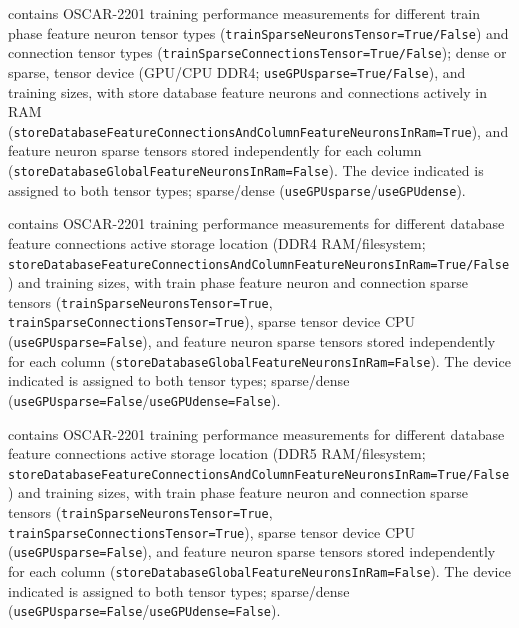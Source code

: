  contains OSCAR-2201 training performance measurements for different train phase feature neuron tensor types (\texttt{trainSparseNeuronsTensor=True/False}) and connection tensor types (\texttt{trainSparseConnectionsTensor=True/False}); dense or sparse, tensor device (GPU/CPU DDR4; \texttt{useGPUsparse=True/False}), and training sizes, with store database feature neurons and connections actively in RAM (\texttt{storeDatabaseFeatureConnectionsAndColumnFeatureNeuronsInRam=True}), and feature neuron sparse tensors stored independently for each column (\texttt{storeDatabaseGlobalFeatureNeuronsInRam=False}). The device indicated is assigned to both tensor types; sparse/dense (\texttt{useGPUsparse}/\texttt{useGPUdense}).

 contains OSCAR-2201 training performance measurements for different database feature connections active storage location (DDR4 RAM/filesystem; \texttt{storeDatabaseFeatureConnectionsAndColumnFeatureNeuronsInRam=True/False}) and training sizes, with train phase feature neuron and connection sparse tensors (\texttt{trainSparseNeuronsTensor=True}, \texttt{trainSparseConnectionsTensor=True}), sparse tensor device CPU (\texttt{useGPUsparse=False}), and feature neuron sparse tensors stored independently for each column (\texttt{storeDatabaseGlobalFeatureNeuronsInRam=False}). The device indicated is assigned to both tensor types; sparse/dense (\texttt{useGPUsparse=False}/\texttt{useGPUdense=False}).

 contains OSCAR-2201 training performance measurements for different database feature connections active storage location (DDR5 RAM/filesystem; \texttt{storeDatabaseFeatureConnectionsAndColumnFeatureNeuronsInRam=True/False}) and training sizes, with train phase feature neuron and connection sparse tensors (\texttt{trainSparseNeuronsTensor=True}, \texttt{trainSparseConnectionsTensor=True}), sparse tensor device CPU (\texttt{useGPUsparse=False}), and feature neuron sparse tensors stored independently for each column (\texttt{storeDatabaseGlobalFeatureNeuronsInRam=False}). The device indicated is assigned to both tensor types; sparse/dense (\texttt{useGPUsparse=False}/\texttt{useGPUdense=False}).

